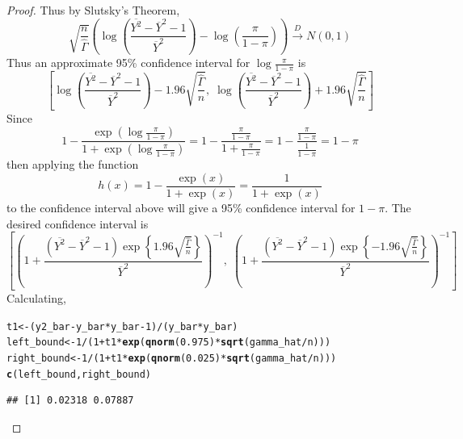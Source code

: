 \documentclass[letterpaper, 12pt]{article}\usepackage[]{graphicx}\usepackage[]{color}
\makeatletter
\newcommand{\hlnum}[1]{\textcolor[rgb]{0.686,0.059,0.569}{#1}}%
\newcommand{\hlopt}[1]{\textcolor[rgb]{0,0,0}{#1}}%
\newcommand{\hlstd}[1]{\textcolor[rgb]{0.345,0.345,0.345}{#1}}%
\newcommand{\hlkwb}[1]{\textcolor[rgb]{0.69,0.353,0.396}{#1}}%
\newcommand{\hlkwd}[1]{\textcolor[rgb]{0.737,0.353,0.396}{\textbf{#1}}}%
\newenvironment{kframe}{%
 \def\at@end@of@kframe{}%
 \ifinner\ifhmode%
  \def\at@end@of@kframe{\end{minipage}}%
  \begin{minipage}{\columnwidth}%
 \fi\fi%
 \def\FrameCommand##1{\hskip\@totalleftmargin \hskip-\fboxsep
 \colorbox{shadecolor}{##1}\hskip-\fboxsep
     \hskip-\linewidth \hskip-\@totalleftmargin \hskip\columnwidth}%
 \MakeFramed {\advance\hsize-\width
   \@totalleftmargin\z@ \linewidth\hsize
   \@setminipage}}%
 {\par\unskip\endMakeFramed%
 \at@end@of@kframe}
\newenvironment{knitrout}{}{} %
\makeatother
\begin{document}
\begin{enumerate}
\begin{enumerate}
\begin{proof}
Thus by Slutsky's Theorem,
\[
\sqrt{\frac{n}{\hat{\Gamma}}} 
\left(
\log \left(
\frac{\overline{Y^2} - \overline{Y}^2 - 1}{\overline{Y}^2}
\right)
-
\log \left(
\frac{\pi}{1-\pi}
\right)
\right)
\xrightarrow{D}
N(0,1)
\]
Thus an approximate 95\% confidence interval for $\log \frac{\pi}{1-\pi}$ is
\[
\left[
\log \left(
\frac{\overline{Y^2} - \overline{Y}^2 - 1}{\overline{Y}^2}
\right)
-1.96 \sqrt{\frac{\hat{\Gamma}}{n}}, \;
\log \left(
\frac{\overline{Y^2} - \overline{Y}^2 - 1}{\overline{Y}^2}
\right)
+ 1.96 \sqrt{\frac{\hat{\Gamma}}{n}}
\right]
\]
Since 
\[
1 -
\frac{ 
\exp\left(
\log \frac{\pi}{1-\pi}
\right)
}
{
1
+
\exp\left(
\log \frac{\pi}{1-\pi}
\right)
}
=
1 - \frac{\frac{\pi}{1-\pi}}{1 + \frac{\pi}{1-\pi}}
=
1 - \frac{\frac{\pi}{1-\pi}}{\frac{1}{1-\pi}}
=
1 - \pi
\]
then applying the function
\[
h(x) = 1 - \frac{\exp(x)}{1+\exp(x)} = \frac{1}{1+\exp(x)}
\]
to the confidence interval above will give a 95\% confidence interval for $1 -\pi$. The desired confidence interval is
\[
\left[
\left(
1
+
\frac{(\overline{Y^2} - \overline{Y}^2 - 1)\exp\left\{
1.96 \sqrt{\frac{\hat{\Gamma}}{n}}
\right\}}{\overline{Y}^2}
\right)^{-1},\;
\left(
1
+
\frac{(\overline{Y^2} - \overline{Y}^2 - 1)\exp\left\{
-1.96 \sqrt{\frac{\hat{\Gamma}}{n}}
\right\}}{\overline{Y}^2}
\right)^{-1}
\right]
\]
Calculating,
\begin{knitrout}
\color{fgcolor}\begin{kframe}
\begin{alltt}
\hlstd{t1} \hlkwb{<-} \hlstd{(y2_bar} \hlopt{-} \hlstd{y_bar} \hlopt{*} \hlstd{y_bar} \hlopt{-} \hlnum{1}\hlstd{)}\hlopt{/}\hlstd{(y_bar} \hlopt{*} \hlstd{y_bar)}
\hlstd{left_bound} \hlkwb{<-} \hlnum{1}\hlopt{/}\hlstd{(}\hlnum{1} \hlopt{+} \hlstd{t1} \hlopt{*} \hlkwd{exp}\hlstd{(}\hlkwd{qnorm}\hlstd{(}\hlnum{0.975}\hlstd{)} \hlopt{*} \hlkwd{sqrt}\hlstd{(gamma_hat}\hlopt{/}\hlstd{n)))}
\hlstd{right_bound} \hlkwb{<-} \hlnum{1}\hlopt{/}\hlstd{(}\hlnum{1} \hlopt{+} \hlstd{t1} \hlopt{*} \hlkwd{exp}\hlstd{(}\hlkwd{qnorm}\hlstd{(}\hlnum{0.025}\hlstd{)} \hlopt{*} \hlkwd{sqrt}\hlstd{(gamma_hat}\hlopt{/}\hlstd{n)))}
\hlkwd{c}\hlstd{(left_bound, right_bound)}
\end{alltt}
\begin{verbatim}
## [1] 0.02318 0.07887
\end{verbatim}
\end{kframe}
\end{knitrout}


\end{proof}
\end{enumerate}
\end{enumerate}
\end{document}

